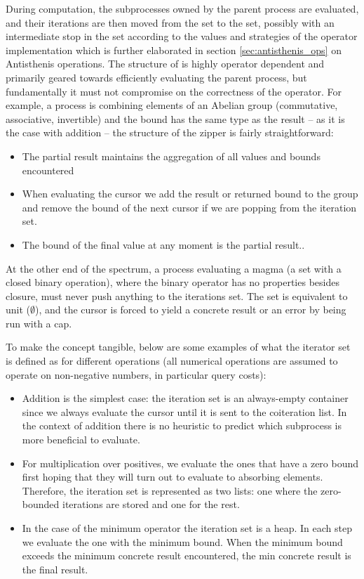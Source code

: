 During computation, the subprocesses owned by the parent process are
evaluated, and their iterations are then moved from the 
set to the  set, possibly with an intermediate stop
in the  set according to the values and
strategies of the operator implementation which is further elaborated in section
\ref{sec:antisthenis_ops} on Antisthenis operations. The structure of
 is highly operator dependent and primarily geared
towards efficiently evaluating the parent process, but fundamentally
it must not compromise on the correctness of the operator. For
example, a process is combining elements of an Abelian group
(commutative, associative, invertible) and the bound has the same type
as the result -- as it is the case with addition -- the structure of
the zipper is fairly straightforward:

\begin{itemize}
\item The partial result maintains the aggregation of all values and
  bounds encountered
\item When evaluating the cursor we add the result or returned bound to the group and
  remove the bound of the next cursor if we are popping from the
  iteration set.
\item The bound of the final value at any moment is the partial result..
\end{itemize}

At the other end of the spectrum, a process evaluating a magma (a set
with a closed binary operation), where the binary operator has no
properties besides closure, must never push anything to the iterations
set. The set is equivalent to unit (\(\emptyset\)), and the cursor is
forced to yield a concrete result or an error by being run with a
 cap.

To make the concept tangible, below are some examples of what the iterator set is
defined as for different operations (all numerical operations are
assumed to operate on non-negative numbers, in particular query
costs):

\begin{itemize}
\item Addition is the simplest case: the iteration set is an
  always-empty container since we always evaluate the cursor until it
  is sent to the coiteration list. In the context of addition there is
  no heuristic to predict which subprocess is more beneficial to
  evaluate.
\item For multiplication over positives, we evaluate the ones
  that have a zero bound first hoping that they will turn out to
  evaluate to absorbing elements. Therefore, the iteration set is
  represented as two lists: one where the zero-bounded iterations
  are stored and one for the rest.
\item In the case of the minimum operator the iteration set is a heap. In each step we
  evaluate the one with the minimum bound. When the minimum
  bound exceeds the minimum concrete result encountered, the min concrete
  result is the final result.
\end{itemize}

